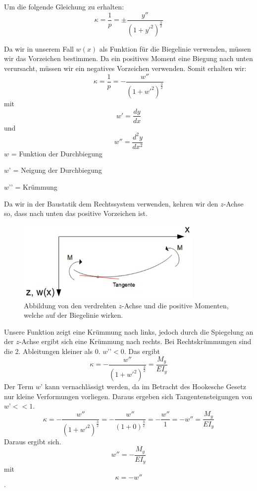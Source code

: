 Um die folgende Gleichung zu erhalten:
\begin{equation}
	\kappa = \frac{1}{p} = \pm \frac{y''}{(1 + {y'}^2)^{\frac{3}{2}}}
\end{equation}

Da wir in unserem Fall $w(x)$ als Funktion für die Biegelinie verwenden, müssen wir das Vorzeichen bestimmen. Da ein positives Moment eine Biegung nach unten verursacht, müssen wir ein negatives Vorzeichen verwenden. Somit erhalten wir:
\begin{equation}
	\kappa=
	\frac{1}{p}=
	-\frac{w''}{\left(1+{w'}^2\right)^\frac{3}{2}}
\end{equation}
mit
\begin{equation}
	w'=
	\frac{dy}{dx} 
\end{equation}
und
\begin{equation}
	w''=
	\frac{d^2y}{dx^2}
\end{equation}
$w$ = Funktion der Durchbiegung

$w’$ = Neigung der Durchbiegung

$w’’$ = Krümmung

Da wir in der Baustatik dem Rechtssystem verwenden, kehren wir den $z$-Achse so, dass nach unten das positive Vorzeichen ist.
\begin{figure}
\centering
	\includegraphics[width=0.8\textwidth]{papers/balken/images/teil2/BiegungverdrehteAchsen.jpg}
\caption{Abbildung von den verdrehten $z$-Achse und die positive Momenten, welche auf der Biegelinie wirken.}
\label{fig:Abbildung von den verdrehten $z$-Achse und die positive Momenten, welche auf der Biegelinie wirken.}
\end{figure}

Unsere Funktion zeigt eine Krümmung nach links, jedoch durch die Spiegelung an der $z$-Achse ergibt sich eine Krümmung nach rechts.
Bei Rechtskrümmungen sind die 2. Ableitungen kleiner als 0. $w’’ < 0$.
Das ergibt
\begin{equation}
	\kappa=
	-\frac{w''}{\left(1+{w'}^2\right)^\frac{3}{2}}=
	\frac{M_y}{EI_y}
\end{equation}
Der Term $w’$ kann vernachlässigt werden, da im Betracht des Hookesche Gesetz nur kleine Verformungen vorliegen.
Daraus ergeben sich Tangentensteigungen von $w’ << 1$.
\begin{equation}
	\kappa=
	-\frac{w''}{\left(1+{w'}^2\right)^\frac{3}{2}}=
	-\frac{w''}{\left(1+0\right)^\frac{3}{2}}=
	-\frac{w''}{1}=-w''=
	\frac{M_y}{EI_y}
\end{equation}
Daraus ergibt sich.
\begin{equation}
	w''=
	-\frac{M_y}{EI_y}
\end{equation}
mit
\begin{equation}
	\kappa=
	-w''
\end{equation}.

